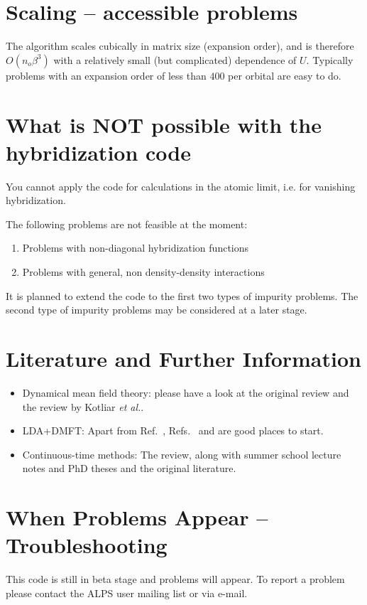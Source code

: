 \documentclass[aps,prb,floatfix,superscriptaddress,twocolumn,notitlepage]{revtex4-1}
\begin{document}
\section{Scaling -- accessible problems}
The algorithm scales cubically in matrix size (expansion order), and is therefore $O(n_o\beta^3)$ with a relatively small (but complicated) dependence of $U$. Typically problems
with an expansion order of less than $400$ per orbital are easy to do.

\section{What is NOT possible with the hybridization code}

You cannot apply the code for calculations in the atomic limit, i.e. for vanishing hybridization.


The following problems are not feasible at the moment:
\begin{enumerate}
\item Problems with non-diagonal hybridization functions
\item Problems with general, non density-density interactions
\end{enumerate}
It is planned to extend the code to the first two types of impurity problems. The second type of impurity problems may be considered at a later stage.

\section{Literature and Further Information}
\begin{itemize}
\item Dynamical mean field theory: please have a look at the original review\cite{Georges96} and the review by Kotliar {\it et al.}\cite{Kotliar06}.
\item LDA+DMFT: Apart from Ref.~, Refs.~ and  are good places to start.
\item Continuous-time methods: The review\cite{Gull11_review}, along with summer school lecture notes\cite{sherbrookenote} and PhD theses\cite{GullPhD} and the original literature.\cite{Rubtsov05,Rubtsov04,Werner06}
\end{itemize}
\section{When Problems Appear -- Troubleshooting}
This code is still in beta stage and problems will appear. To report a problem please contact the ALPS user mailing list or \Emanuel via e-mail.
\end{document}
